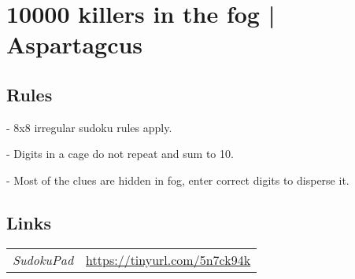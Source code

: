 \section[10000 killers in the fog | Aspartagcus {[\emph{Irregular Killer Fog Of War Sudoku}]}]{10000 killers in the fog | {\normalfont Aspartagcus}}
\label{sec:43-10000-killers-in-the-fog-aspartagcus}

\subsection*{Rules}
\begin{markdown}
- 8x8 irregular sudoku rules apply.

- Digits in a cage do not repeat and sum to 10.

- Most of the clues are hidden in fog, enter correct digits to disperse it.
\end{markdown}
\subsection*{Links}
\begin{tabularx}{\textwidth}{l X}
\emph{SudokuPad} & \url{https://tinyurl.com/5n7ck94k} \\
\end{tabularx}
\pagebreak
